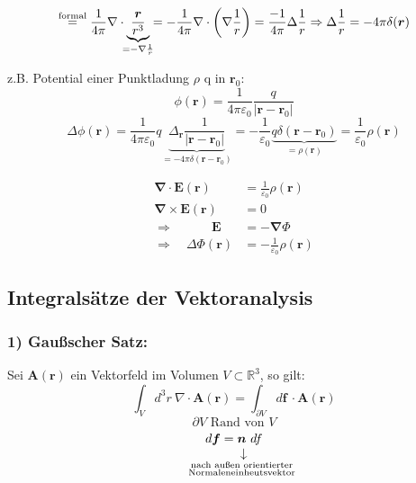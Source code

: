 \documentclass[titlepage,11pt,a4paper,ngerman]{report}
\newcommand{\tx}[1]{\textrm{#1}}
\newcommand{\custo}[3]{\underset{\scriptstyle\overset{\mkern4mu\rotatebox{-90}{$\,#1$}}{#3}}{#2}}
\renewcommand{\Phi}{\varPhi}
\newcommand{\kq}{\frac{1}{4\pi\epsilon_0}}
\renewcommand{\vec}[1]{\boldsymbol{#1}}
\renewcommand{\epsilon}{\varepsilon}
\renewcommand{\paragraph}[1]{\subsubsection{#1}}
\newcommand{\bbb}[2]{\begin{tcolorbox}[colback=white,colframe=black,fonttitle=\bfseries,title=#1,sharp corners,tcbox raise base]#2\end{tcolorbox}}
\begin{document}
$$\overset{\textrm{formal}}{=} \frac{1}{4 \pi} \nabla \cdot \underbrace{\frac{\vec{r}}{r^3}}_{\mathclap{= - \nabla \frac{1}{r}}} = - \frac{1}{4 \pi} \nabla \cdot \bigg(\nabla \frac{1}{r}\bigg) = \frac{-1}{4 \pi} \Delta \frac{1}{r} \Rightarrow \Delta \frac{1}{r} = -4 \pi \delta(\vec{r})$$

z.B. Potential einer Punktladung $\rho$ q in $\vec{r}_0$:
$$\phi(\vec{r}) = \kq \frac{q}{|\vec{r} - \vec{r}_0|}$$
$$\Delta \phi(\vec{r}) = \kq q \underbrace{\Delta_{\vec{r}} \frac{1}{|\vec{r} - \vec{r}_0|} }_{= - 4 \pi \delta(\vec{r} - \vec{r}_0)} = - \frac{1}{\epsilon_0} \underbrace{q \delta(\vec{r} - \vec{r}_0)}_{= \rho(\vec{r})} = \frac{1}{\epsilon_0} \rho(\vec{r})$$


\bbb{Wiederholung}{\begin{align*}
	\vec{\nabla} \cdot \vec{E}(\vec{r}) &= \frac{1}{\epsilon_0} \rho(\vec{r})\\
	\vec{\nabla} \times \vec{E}(\vec{r}) &= 0 \\[10pt]
	\Rightarrow \qquad \quad \vec{E} &= - \vec{\nabla} \Phi \\
	\Rightarrow \quad \Delta \Phi (\vec{r}) &= - \frac{1}{\epsilon_0} \rho(\vec{r})
	\end{align*}
}

\subsection{Integralsätze der Vektoranalysis}

\paragraph{1) Gaußscher Satz:} 
Sei $\vec{A}(\vec{r})$ ein Vektorfeld im Volumen $V \subset \mathbb R^3$, so gilt:
$$\int_V d^3r\ \nabla \cdot \vec{A}(\vec{r}) = \int_{\partial V} d\vec{f}\ \cdot \vec{A}(\vec{r})$$
$$\partial V \tx{ Rand von } V$$
$$d \vec{f} = \custo{\rightarrow}{\vec{n}}{\mathclap{\substack{\textrm{nach außen orientierter} \\ \tx{Normaleneinheutsvektor}}}}\ df$$




\end{document}
